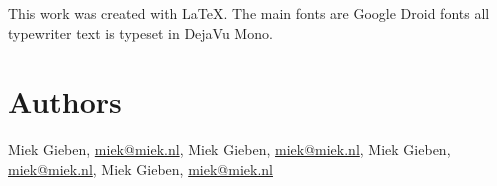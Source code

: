 This work was created with \LaTeX. The main fonts are Google Droid fonts all
typewriter text is typeset in DejaVu Mono.

\newpage %

\section{Authors}
Miek Gieben, \url{miek@miek.nl},
Miek Gieben, \url{miek@miek.nl},
Miek Gieben, \url{miek@miek.nl},
Miek Gieben, \url{miek@miek.nl}
